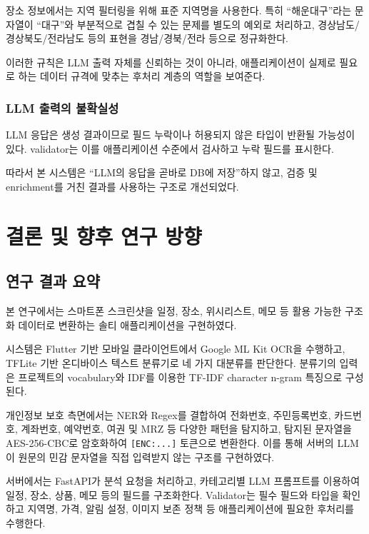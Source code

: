 \documentclass[11pt,a4paper]{article}
\begin{document}
장소 정보에서는 지역 필터링을 위해 표준 지역명을 사용한다. 특히 ``해운대구''라는 문자열이 ``대구''와 부분적으로 겹칠 수 있는 문제를 별도의 예외로 처리하고, 경상남도/경상북도/전라남도 등의 표현을 경남/경북/전라 등으로 정규화한다.

이러한 규칙은 LLM 출력 자체를 신뢰하는 것이 아니라, 애플리케이션이 실제로 필요로 하는 데이터 규격에 맞추는 후처리 계층의 역할을 보여준다.

\subsubsection{LLM 출력의 불확실성}

LLM 응답은 생성 결과이므로 필드 누락이나 허용되지 않은 타입이 반환될 가능성이 있다. validator는 이를 애플리케이션 수준에서 검사하고 누락 필드를 표시한다.

따라서 본 시스템은 ``LLM의 응답을 곧바로 DB에 저장''하지 않고, 검증 및 enrichment를 거친 결과를 사용하는 구조로 개선되었다.

\newpage

\section{결론 및 향후 연구 방향}

\subsection{연구 결과 요약}

본 연구에서는 스마트폰 스크린샷을 일정, 장소, 위시리스트, 메모 등 활용 가능한 구조화 데이터로 변환하는 솔티 애플리케이션을 구현하였다.

시스템은 Flutter 기반 모바일 클라이언트에서 Google ML Kit OCR을 수행하고, TFLite 기반 온디바이스 텍스트 분류기로 네 가지 대분류를 판단한다. 분류기의 입력은 프로젝트의 vocabulary와 IDF를 이용한 TF-IDF character n-gram 특징으로 구성된다.

개인정보 보호 측면에서는 NER와 Regex를 결합하여 전화번호, 주민등록번호, 카드번호, 계좌번호, 예약번호, 여권 및 MRZ 등 다양한 패턴을 탐지하고, 탐지된 문자열을 AES-256-CBC로 암호화하여 \texttt{[ENC:...]} 토큰으로 변환한다. 이를 통해 서버의 LLM이 원문의 민감 문자열을 직접 입력받지 않는 구조를 구현하였다.

서버에서는 FastAPI가 분석 요청을 처리하고, 카테고리별 LLM 프롬프트를 이용하여 일정, 장소, 상품, 메모 등의 필드를 구조화한다. Validator는 필수 필드와 타입을 확인하고 지역명, 가격, 알림 설정, 이미지 보존 정책 등 애플리케이션에 필요한 후처리를 수행한다.
\end{document}
